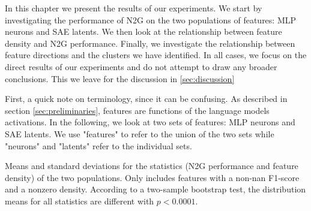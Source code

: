 In this chapter we present the results of our experiments.
We start by investigating the performance of N2G on the two populations of features: MLP neurons and SAE latents.
We then look at the relationship between feature density and N2G performance.
Finally, we investigate the relationship between feature directions and the clusters we have identified.
In all cases, we focus on the direct results of our experiments and do not attempt to draw any broader conclusions.
This we leave for the discussion in \autoref{sec:discussion}

First, a quick note on terminology, since it can be confusing.
As described in section \ref{sec:preliminaries}, features are functions of the language models activations.
In the following, we look at two sets of features: MLP neurons and SAE latents.
We use "features" to refer to the union of the two sets while "neurons" and "latents" refer to the individual sets.



\begin{table}[ht]
    \centering
    
    \caption{Means and standard deviations for the statistics (N2G performance and feature density) of the two populations. Only includes features with a non-nan F1-score and a nonzero density. According to a two-sample bootstrap test, the distribution means for all statistics are different with $p<0.0001$.}
    \label{tab:distributions}
\end{table}

